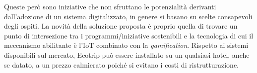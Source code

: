 Queste però sono iniziative che non sfruttano le potenzialità derivanti dall'adozione di un sistema digitalizzato, in genere si basano su scelte consapevoli degli ospiti. La novità della soluzione proposta è proprio quella di trovare un punto di intersezione tra i programmi/iniziative sostenibili e la tecnologia di cui il meccanismo abilitante è l'IoT combinato con la \textit{gamification}. Rispetto ai sistemi disponibili sul mercato, Ecotrip può essere installato su un qualsiasi hotel, anche se datato, a un prezzo calmierato poiché si evitano i costi di ristrutturazione.

\newpage

